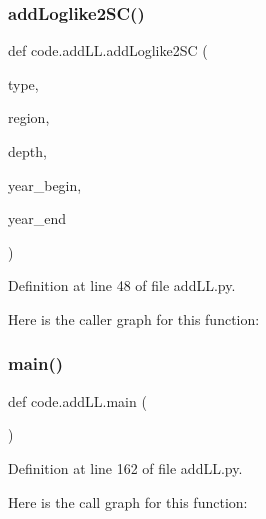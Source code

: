 \subsubsection{\texorpdfstring{add\+Loglike2\+S\+C()}{addLoglike2SC()}}
{\footnotesize\ttfamily def code.\+add\+L\+L.\+add\+Loglike2\+SC (\begin{DoxyParamCaption}\item[{}]{type,  }\item[{}]{region,  }\item[{}]{depth,  }\item[{}]{year\+\_\+begin,  }\item[{}]{year\+\_\+end }\end{DoxyParamCaption})}



Definition at line 48 of file add\+L\+L.\+py.

Here is the caller graph for this function\+:
\mbox{\label{namespacecode_1_1add_l_l_a03f8b179b69e620c74d5c55fd97cbf41}} 
\subsubsection{\texorpdfstring{main()}{main()}}
{\footnotesize\ttfamily def code.\+add\+L\+L.\+main (\begin{DoxyParamCaption}{ }\end{DoxyParamCaption})}



Definition at line 162 of file add\+L\+L.\+py.

Here is the call graph for this function\+:

